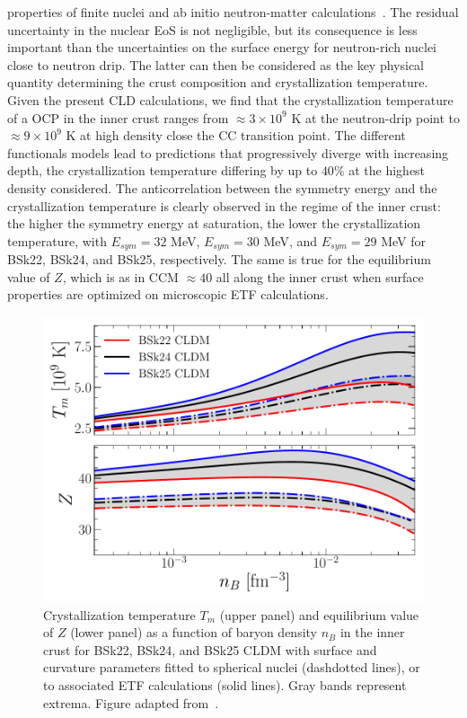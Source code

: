 properties of finite nuclei and ab initio neutron-matter 
calculations~\cite{Goriely2013}. The residual uncertainty in the nuclear EoS is 
not negligible, but its consequence is less important than the uncertainties on 
the surface energy for neutron-rich nuclei close to neutron drip. The latter 
can then be considered as the key physical quantity determining the crust 
composition and crystallization temperature.
%
Given the present CLD calculations, we find that the crystallization 
temperature of a OCP in the inner crust ranges from $\approx 3\times 10^9$ K at 
the neutron-drip point to $\approx 9\times 10^9$ K at high density close the CC 
transition point.
The different functionals models lead to predictions that progressively diverge 
with increasing depth, the crystallization temperature differing by up to 
$40\%$ at the highest density considered.
The anticorrelation between the symmetry energy and the crystallization
temperature is clearly observed in the regime of the inner crust: the higher 
the symmetry energy at saturation, the lower the crystallization temperature, 
with $E_{sym}=32$ MeV, $E_{sym}=30$ MeV, and $E_{sym}=29$ MeV for BSk22, 
BSk24, and BSk25, respectively. The same is true for the equilibrium value of
$Z$, which is as in CCM $\approx 40$ all along the inner crust when 
surface properties are optimized on microscopic ETF calculations.
%
\begin{figure}[!t]
  \begin{center}
    \includegraphics[width=0.9\linewidth]{figures/tm_compo_final1.pdf}
  \end{center}
  \caption[Crystallization temperature and equilibrium value of $Z$ of the
  one-component plasma versus baryon density in the inner crust]{
    Crystallization temperature $T_m$ (upper panel) and
    equilibrium value of $Z$ (lower panel) as a function of baryon density 
    $n_B$ in the inner crust for BSk22, BSk24, and BSk25 CLDM with surface and
  curvature parameters fitted to spherical nuclei (dashdotted lines), or to
associated ETF calculations (solid lines). Gray bands represent extrema. Figure
adapted from~\cite{Carreau2019}.}\label{fig:tm_compo_final1}
\end{figure}
 
